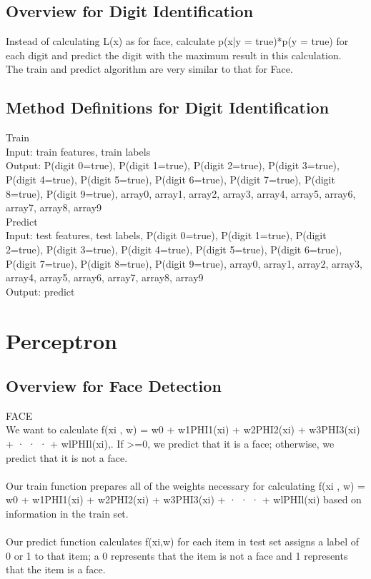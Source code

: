 \documentclass{article}
\begin{document}
\subsection{Overview for Digit Identification}

Instead of calculating L(x) as for face, calculate p(x|y = true)*p(y = true) for each digit and predict the digit with the maximum result in this calculation. \\
The train and predict algorithm are very similar to that for Face.\\
\subsection{Method Definitions for Digit Identification}
Train\\
Input: train features, train labels\\
Output: P(digit 0=true), P(digit 1=true), P(digit 2=true), P(digit 3=true), P(digit 4=true), P(digit 5=true), P(digit 6=true), P(digit 7=true), P(digit 8=true), P(digit 9=true),  array0, array1, array2, array3, array4, array5, array6, array7, array8, array9\\
Predict\\
Input: test features, test labels, P(digit 0=true), P(digit 1=true), P(digit 2=true), P(digit 3=true), P(digit 4=true), P(digit 5=true), P(digit 6=true), P(digit 7=true), P(digit 8=true), P(digit 9=true),  array0, array1, array2, array3, array4, array5, array6, array7, array8, array9\\
Output: predict



\section{Perceptron}

\subsection{Overview for Face Detection}

FACE\\
We want to calculate f(xi , w) = w0 + w1PHI1(xi) + w2PHI2(xi) + w3PHI3(xi) + · · · + wlPHIl(xi),. If >=0, we predict that it is a face; otherwise, we predict that it is not a face. \\\\
Our train function prepares all of the weights necessary for calculating f(xi , w) = w0 + w1PHI1(xi) + w2PHI2(xi) + w3PHI3(xi) + · · · + wlPHIl(xi) based on information in the train set.\\\\
Our predict function calculates f(xi,w) for each item in test set assigns a label of 0 or 1 to that item; a 0 represents that the item is not a face and 1 represents that the item is a face.\\\\
\end{document}
